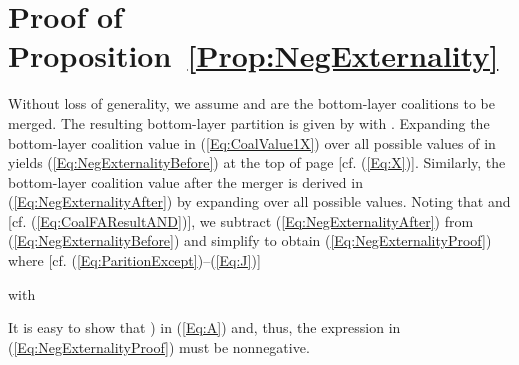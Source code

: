 \documentclass[journal,draftclsnofoot,onecolumn]{IEEEtran}
\theoremstyle{definition}
\newif\ifdoublecolumn
\begin{document}
\ifdoublecolumn
\else
\begin{figure*}
\normalsize

\hrulefill
\vspace*{-10.2pt}
\label{Fig:Eq:NegExternalityBeforeAfter}
\end{figure*}
\fi

\appendices 
\section{Proof of Proposition~\ref{Prop:NegExternality}}\label{Sec:NegExternalityProof}
Without loss of generality, we assume  and  are the bottom-layer coalitions to be merged. The resulting bottom-layer partition is given by  with . Expanding the bottom-layer coalition value  in (\ref{Eq:CoalValue1X}) over all possible values of  in  yields (\ref{Eq:NegExternalityBefore}) at the top of page \pageref{Eq:NegExternalityBefore} [cf. (\ref{Eq:X})]. Similarly, the bottom-layer coalition value  after the merger is derived in (\ref{Eq:NegExternalityAfter}) by expanding over all possible  values. Noting that  and  [cf. (\ref{Eq:CoalFAResultAND})], we subtract (\ref{Eq:NegExternalityAfter}) from (\ref{Eq:NegExternalityBefore}) and simplify to obtain (\ref{Eq:NegExternalityProof}) where [cf. (\ref{Eq:ParitionExcept})--(\ref{Eq:J})]

with

It is easy to show that  ) in (\ref{Eq:A}) and, thus, the expression in (\ref{Eq:NegExternalityProof}) must be nonnegative.




\end{document}
